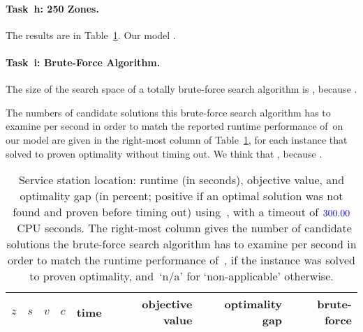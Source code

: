 \paragraph{Task~h: 250 Zones.}
The results are in Table~\ref{tab:res:mip}.
%
Our model .

\paragraph{Task~i: Brute-Force Algorithm.}
The size of the search space of a totally brute-force search algorithm
is , because \todo{\filler}.

The numbers of candidate solutions this brute-force search algorithm
has to examine per second in order to match the reported runtime
performance of~\SolverMIP on our model are given in the right-most
column of Table~\ref{tab:res:mip}, for each instance that~\SolverMIP
solved to proven optimality without timing out.
%
We think that \todo{\filler}, because \todo{\filler}.

\begin{table}[t]  %
  \centering
  \begin{tabular}{rrrrrrrr}  %
    $z$ & $s$ & $v$ & $c$ & time & objective value & optimality gap & brute-force \\
    \midrule
  \end{tabular}
  \caption{Service station location: runtime (in seconds), objective
    value, and optimality gap (in percent; positive if an optimal
    solution was not found and proven before timing out)
    using~\SolverMIP, with a timeout of ${\color{blue}300.00}$~CPU seconds.
    The right-most column gives the number of candidate solutions the
    brute-force search algorithm has to examine per second in order to
    match the runtime performance of~\SolverMIP, if the instance was
    solved to proven optimality, and~`n/a' for `non-applicable'
    otherwise.
  }
  \label{tab:res:mip}
\end{table}

